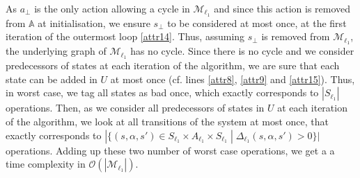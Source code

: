 \begin{proof2}
%
As $a_\bot$ is the only action allowing a cycle in $\mathcal{M}_{\ell_1}$ and since this action is removed from $\mathbb{A}$ at initialisation,
we ensure $s_\bot$ to be considered at most once, at the first iteration of the outermost loop \ref{attr14}.
Thus, assuming $s_\bot$ is removed from $\mathcal{M}_{\ell_1}$, the underlying graph of $\mathcal{M}_{\ell_1}$ has no cycle.
Since there is no cycle and we consider predecessors of states at each iteration of the algorithm, we are sure that each state can be added in $U$ at most once (cf. lines \ref{attr8}, \ref{attr9} and \ref{attr15}).
Thus, in worst case, we tag all states as bad once, which exactly corresponds to $|S_{\ell_1}|$ operations.
Then, as we consider all predecessors of states in $U$ at each iteration of the algorithm, we look at all transitions of the system at most once, that exactly corresponds to $|\{(s, \alpha, s') \in S_{\ell_1} \times A_{\ell_1} \times S_{\ell_1} \; | \; \Delta_{\ell_1}(s, \alpha, s') > 0 \}|$ operations.
Adding up these two number of worst case operations, we get a a time complexity in $\mathcal{O}(|\mathcal{M}_{\ell_1}|)$.
\end{proof2}

